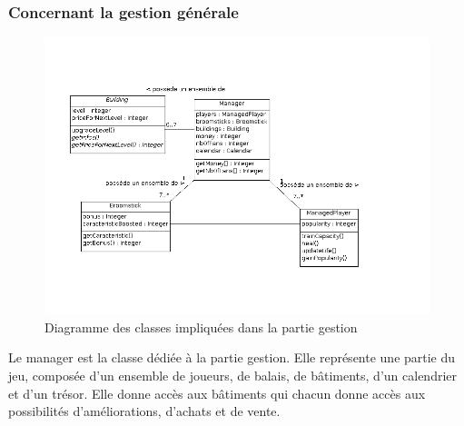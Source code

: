 \documentclass[a4paper,titlepage]{scrreprt}
\begin{document}
\begin{itemize}
  \subsubsection{Concernant la gestion générale}
    \begin{figure}[H]
    \center
    \includegraphics[scale=0.5]{uml/class/DiagrammedeclassesManagement.png}
    \caption{Diagramme des classes impliquées dans la partie gestion}
    \end{figure}	
    Le manager est la classe dédiée à la partie gestion. Elle représente une partie du jeu,
    composée d'un ensemble de joueurs, de balais, de bâtiments, d'un calendrier et d'un trésor.
    Elle donne accès aux bâtiments qui chacun donne accès aux possibilités d'améliorations, d'achats et de vente.

\end{itemize}
\end{document}
